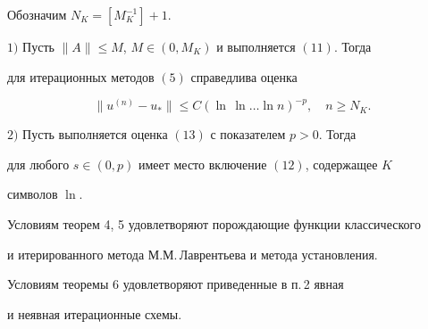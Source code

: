  


Обозначим $N_K=[M^{-1}_K]+1$. 


 


\begin{thm} 


$1)$ Пусть $\|A\|\le M$, $M\in(0,M_K)$ и выполняется $(11)$. Тогда


для итерационных методов $(5)$ справедлива оценка 


\begin{equation} 


\|u^{(n)}-u_*\|\le C(\ln\,\ln\dotsc \ln n)^{-p},\quad 


n\ge N_K. 


\end{equation} 


 


$2)$ Пусть выполняется оценка $(13)$ с показателем $p>0$. Тогда 


для любого $s\in(0,p)$ имеет место включение $(12)$, содержащее $K$ 


символов $\ln$. 


\end{thm}


 


Условиям теорем 4, 5 удовлетворяют порождающие функции классического 


и итерированного метода М.М.\,Лаврентьева и метода установления. 


Условиям теоремы 6 удовлетворяют приведенные в п.\,2 явная 


и неявная итерационные схемы. 


 


